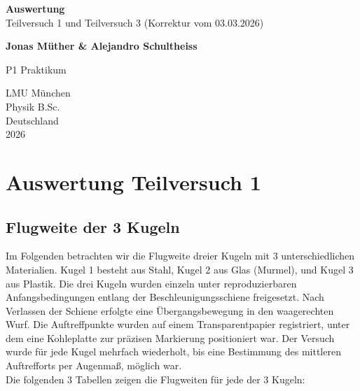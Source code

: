 \documentclass{article}
\begin{document}
\begin{titlepage}
    \begin{center}
        \vspace*{1cm}
            
        \Huge
        \textbf{Auswertung}\\
        Teilversuch 1 und Teilversuch 3 (Korrektur vom 03.03.2026) 
        \vspace{0.5cm}
        \LARGE
        
        
        \vspace{1.8cm}
            
        \textbf{Jonas Müther \& Alejandro Schultheiss} \\
        \vfill
            
        P1 Praktikum\\
       
            
        \vspace{0.8cm}
  

        \vspace{1.8cm}
        \Large
        LMU München \\
        Physik B.Sc.\\
        Deutschland\\
        2026
            
    \end{center}
\end{titlepage}
\tableofcontents

\newpage
\section{Auswertung Teilversuch 1}
\subsection{Flugweite der 3 Kugeln}
Im Folgenden betrachten wir die Flugweite dreier Kugeln mit 3 unterschiedlichen Materialien. Kugel 1 besteht aus Stahl, Kugel 2 aus Glas (Murmel), und Kugel 3 aus Plastik. Die drei Kugeln wurden einzeln unter reproduzierbaren Anfangsbedingungen entlang der Beschleunigungsschiene freigesetzt. Nach Verlassen der Schiene erfolgte eine Übergangsbewegung in den waagerechten Wurf. Die Auftreffpunkte wurden auf einem Transparentpapier registriert, unter dem eine Kohleplatte zur präzisen Markierung positioniert war. Der Versuch wurde für jede Kugel mehrfach wiederholt, bis eine Bestimmung des mittleren Auftrefforts per Augenmaß, möglich war. \\
Die folgenden 3 Tabellen zeigen die Flugweiten für jede der 3 Kugeln: 
\end{document}
